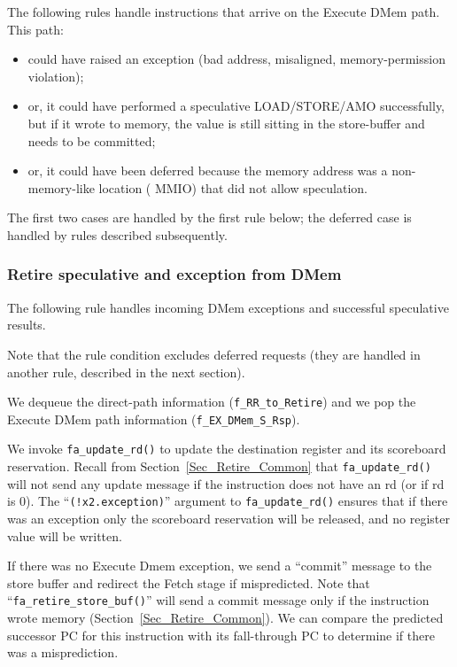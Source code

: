 \label{Sec_Fife_S5_DMem}

The following rules handle instructions that arrive on the Execute
DMem path.  This path:

\begin{itemize}
 \item could have raised an exception (bad address,
       misaligned, memory-permission violation);
 \item or, it could have performed
       a speculative LOAD/STORE/AMO successfully, but if it wrote to memory,
       the value is still sitting in the store-buffer and needs to be
       committed;
 \item or, it could have been deferred because the memory address
       was a non-memory-like location ({\eg} MMIO) that did not allow
       speculation.
\end{itemize}

The first two cases are handled by the first rule below; the deferred
case is handled by rules described subsequently.


\subsubsection{Retire speculative and exception from DMem}

\label{Sec_Fife_Retire_DMem}

The following rule handles incoming DMem exceptions and successful
speculative results.


Note that the rule condition excludes deferred requests (they are
handled in another rule, described in the next section).

We dequeue the direct-path information (\verb|f_RR_to_Retire|) and we
pop the Execute DMem path information (\verb|f_EX_DMem_S_Rsp|).

We invoke \verb|fa_update_rd()| to update the destination register and
its scoreboard reservation.  Recall from
Section~\ref{Sec_Retire_Common} that \verb|fa_update_rd()| will not
send any update message if the instruction does not have an rd (or if
rd is 0).  The ``\verb|(!x2.exception)|'' argument to
\verb|fa_update_rd()| ensures that if there was an exception only the
scoreboard reservation will be released, and no register value will be
written.

If there was no Execute Dmem exception, we send a ``commit'' message
to the store buffer and redirect the Fetch stage if mispredicted.
Note that ``\verb|fa_retire_store_buf()|'' will send a commit message
only if the instruction wrote memory
(Section~\ref{Sec_Retire_Common}).  We can compare the predicted
successor PC for this instruction with its fall-through PC to
determine if there was a misprediction.

